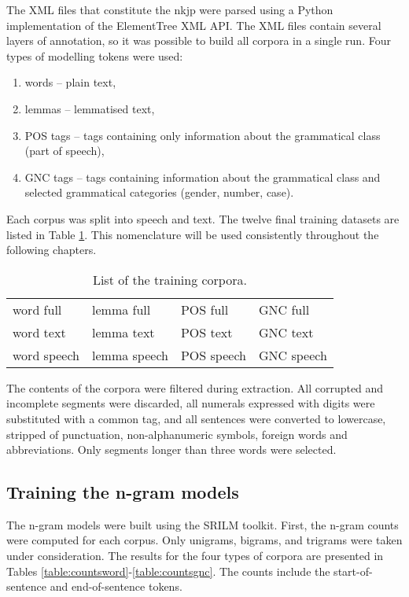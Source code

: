 The XML files that constitute the \gls{nkjp} were parsed using a Python implementation of the ElementTree XML API. The XML files contain several layers of annotation, so it was possible to build all corpora in a single run. Four types of modelling tokens were used:

\begin{enumerate}
	\item words -- plain text,
	\item lemmas -- lemmatised text, 
	\item POS tags -- tags containing only information about the grammatical class (part of speech),
	\item GNC tags -- tags containing information about the grammatical class and selected grammatical categories (gender, number, case).
\end{enumerate}

Each corpus was split into speech and text. The twelve final training datasets are listed in Table \ref{table:datasets}. This nomenclature will be used consistently throughout the following chapters. 

\begin{table}[!htbp]
	\centering
	\caption{List of the training corpora.}
	\begin{tabular*}{.6\linewidth}{@{\extracolsep{\fill}}llll}
	\label{table:datasets}
		word full   & lemma full   & POS full   & GNC full \\ 
		word text   & lemma text   & POS text   & GNC text \\
		word speech & lemma speech & POS speech & GNC speech \\ 
	\end{tabular*}
\end{table}

The contents of the corpora were filtered during extraction. All corrupted and incomplete segments were discarded, all numerals expressed with digits were substituted with a common tag, and all sentences were converted to lowercase, stripped of punctuation, non-alphanumeric symbols, foreign words and abbreviations. Only segments longer than three words were selected. 

\subsection{Training the n-gram models}
The n-gram models were built using the SRILM toolkit. First, the n-gram counts were computed for each corpus. Only unigrams, bigrams, and trigrams were taken under consideration. The results for the four types of corpora are presented in Tables \ref{table:countsword}-\ref{table:countsgnc}. The counts include the start-of-sentence and end-of-sentence tokens. 

